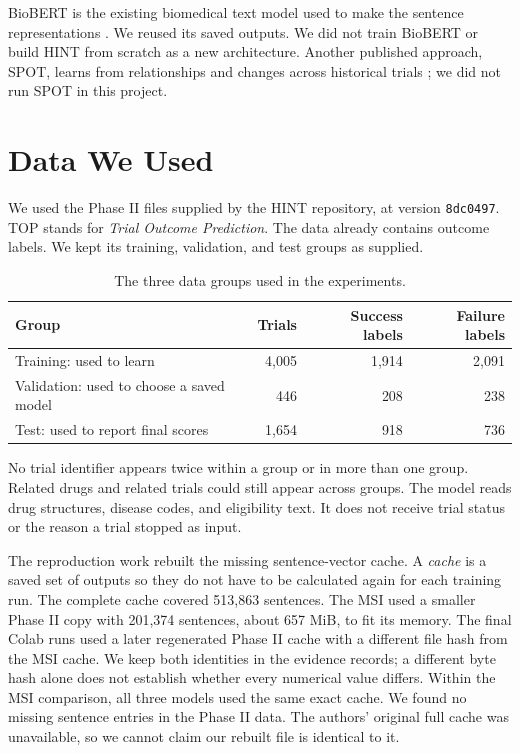 \documentclass[10pt,letterpaper]{article}
\begin{document}
BioBERT is the existing biomedical text model used to make the sentence representations \cite{biobert}. We reused its saved outputs. We did not train BioBERT or build HINT from scratch as a new architecture. Another published approach, SPOT, learns from relationships and changes across historical trials \cite{spot}; we did not run SPOT in this project.

\section{Data We Used}
We used the Phase II files supplied by the HINT repository, at version \texttt{8dc0497}. TOP stands for \emph{Trial Outcome Prediction}. The data already contains outcome labels. We kept its training, validation, and test groups as supplied.

\begin{table}[H]
\centering
\caption{The three data groups used in the experiments.}
\begin{tabular}{lrrr}\toprule
Group & Trials & Success labels & Failure labels\\\midrule
Training: used to learn & 4,005 & 1,914 & 2,091\\
Validation: used to choose a saved model & 446 & 208 & 238\\
Test: used to report final scores & 1,654 & 918 & 736\\\bottomrule
\end{tabular}
\end{table}

No trial identifier appears twice within a group or in more than one group. Related drugs and related trials could still appear across groups. The model reads drug structures, disease codes, and eligibility text. It does not receive trial status or the reason a trial stopped as input.

The reproduction work rebuilt the missing sentence-vector cache. A \emph{cache} is a saved set of outputs so they do not have to be calculated again for each training run. The complete cache covered 513,863 sentences. The MSI used a smaller Phase II copy with 201,374 sentences, about 657 MiB, to fit its memory. The final Colab runs used a later regenerated Phase II cache with a different file hash from the MSI cache. We keep both identities in the evidence records; a different byte hash alone does not establish whether every numerical value differs. Within the MSI comparison, all three models used the same exact cache. We found no missing sentence entries in the Phase II data. The authors' original full cache was unavailable, so we cannot claim our rebuilt file is identical to it.
\end{document}
